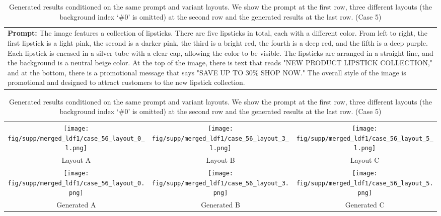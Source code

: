 \begin{table}[htbp]
    \centering
    \begin{tabular}{p{\textwidth}}
    \midrule
    \textbf{Prompt:} \small{The image features a collection of lipsticks. There are five lipsticks in total, each with a different color. From left to right, the first lipstick is a light pink, the second is a darker pink, the third is a bright red, the fourth is a deep red, and the fifth is a deep purple. Each lipstick is encased in a silver tube with a clear cap, allowing the color to be visible. The lipsticks are arranged in a straight line, and the background is a neutral beige color. At the top of the image, there is text that reads "NEW PRODUCT LIPSTICK COLLECTION," and at the bottom, there is a promotional message that says "SAVE UP TO 30\% SHOP NOW." The overall style of the image is promotional and designed to attract customers to the new lipstick collection.}
    \vspace{1em}
    \end{tabular}
    \begin{tabular}{ccc}
        \texttt{[image: fig/supp/merged\_ldf1/case\_56\_layout\_0\_l.png]} &
        \texttt{[image: fig/supp/merged\_ldf1/case\_56\_layout\_3\_l.png]} &
        \texttt{[image: fig/supp/merged\_ldf1/case\_56\_layout\_5\_l.png]} \\
        \small{Layout A} & \small{Layout B} & \small{Layout C} \\[1em]
        \texttt{[image: fig/supp/merged\_ldf1/case\_56\_layout\_0.png]} &
        \texttt{[image: fig/supp/merged\_ldf1/case\_56\_layout\_3.png]} &
        \texttt{[image: fig/supp/merged\_ldf1/case\_56\_layout\_5.png]} \\
        \small{Generated A} & \small{Generated B} & \small{Generated C} \\
        \bottomrule
    \end{tabular}
    
    \caption{Generated results conditioned on the same prompt and variant layouts. We show the prompt at the first row, three different layouts (the background index `\#0' is omitted) at the second row and the generated results at the last row. (Case 5)}
    \label{tab:variant_layout5}
\end{table}


